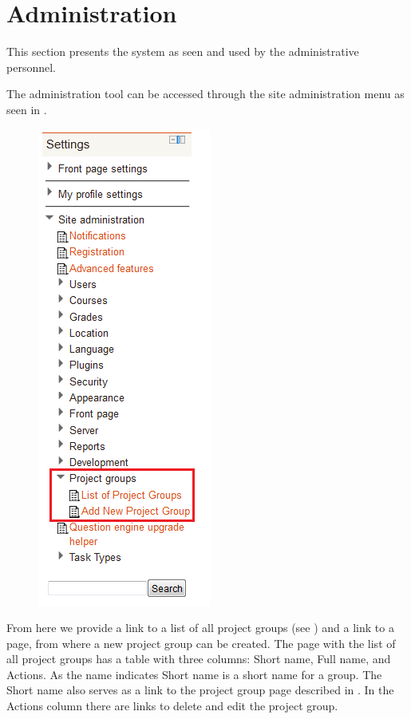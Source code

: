 \section{Administration}
\label{sec:adminPrensentation}
This section presents the system as seen and used by the administrative personnel.

The administration tool can be accessed through the site administration menu as seen in .

\begin{figure}[htb]
	\centering
		\includegraphics[scale=0.75]{images/admin-navigation.png}
	\label{fig:navigation}
\end{figure}

From here we provide a link to a list of all project groups (see ) and a link to a page, from where a new project group can be created.
The page with the list of all project groups has a table with three columns: Short name, Full name, and Actions.
As the name indicates Short name is a short name for a group. 
The Short name also serves as a link to the project group page described in .
In the Actions column there are links to delete and edit the project group.

